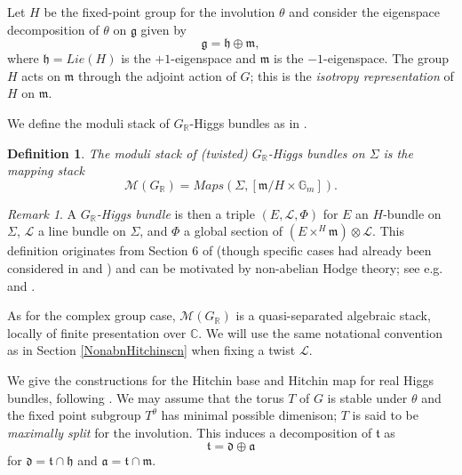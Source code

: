 \documentclass{amsart}
\newtheorem{definition}[theorem]{Definition}
\theoremstyle{remark}
\newtheorem{remark}[theorem]{Remark}
\numberwithin{theorem}{section}
\numberwithin{equation}{section}
\begin{document}
Let $H$ be the fixed-point group for the involution $\theta$ and consider the eigenspace decomposition of $\theta$ on $\mathfrak{g}$ given by
\begin{equation}\label{CartanDecompositioneqn}
        \mathfrak{g} = \mathfrak{h}\oplus \mathfrak{m},
    \end{equation}
    where $\mathfrak{h} = Lie(H)$ is the $+1$-eigenspace and $\mathfrak{m}$ is the $-1$-eigenspace. The group $H$ acts on $\mathfrak{m}$ through the adjoint action of $G$; this is the \emph{isotropy representation} of $H$ on $\mathfrak{m}$. 
    
    We define the moduli stack of $G_\mathbb{R}$-Higgs bundles as in \cite[Section 4.1]{Peon-Nieto1}.

\begin{definition}\label{RealHiggsdef}
    The \emph{moduli stack of (twisted) $G_{\mathbb{R}}$-Higgs bundles on $\Sigma$} is the mapping stack 
    \begin{equation}\label{RealHiggseqn}
        \mathcal M(G_{\mathbb{R}}) = Maps(\Sigma,[\mathfrak{m} /H\times \mathbb{G}_m]).
    \end{equation}
\end{definition}

\begin{remark}\label{RealHiggsrmk}
    A \emph{$G_\mathbb{R}$-Higgs bundle} is then a triple $(E, \mathcal L, \Phi)$ for $E$ an $H$-bundle on $\Sigma$, $\mathcal L$ a line bundle on $\Sigma$, and $\Phi$ a global section of $(E \times^H\mathfrak{m}) \otimes \mathcal L$. This definition originates from Section 6 of \cite{Simpson1} (though specific cases had already been considered in \cite{Hitchin1} and \cite{Hitchin3}) and can be motivated by non-abelian Hodge theory; see e.g. \cite[Corollary 6.16]{Simpson1} and \cite[Theorem 3.32]{GPGMIR}.
    
    As for the complex group case, $\mathcal M(G_\mathbb{R})$ is a quasi-separated algebraic stack, locally of finite presentation over $\mathbb{C}$. We will use the same notational convention as in Section \ref{NonabnHitchinscn} when fixing a twist $\mathcal L$.
\end{remark}

We give the constructions for the Hitchin base and Hitchin map for real Higgs bundles, following \cite[Sections 3.1 and 4.1]{Peon-Nieto1}. We may assume that the torus $T$ of $G$ is stable under $\theta$ and the fixed point subgroup $T^\theta$ has minimal possible dimenison; $T$ is said to be \emph{maximally split} for the involution. This induces a decomposition of $\mathfrak{t}$ as
\begin{equation}\label{TorusCartandecompeqn}
    \mathfrak{t} = \mathfrak{d}\oplus \mathfrak{a}
\end{equation}
for $\mathfrak{d} = \mathfrak{t} \cap \mathfrak{h}$ and $\mathfrak{a} = \mathfrak{t} \cap \mathfrak{m}$. 
\end{document}
